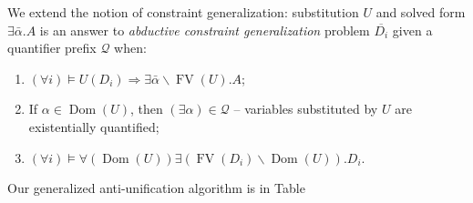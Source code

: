 \documentclass{article}
\newcommand{\tmem}[1]{{\em #1\/}}
\newcommand{\tmop}[1]{\ensuremath{\operatorname{#1}}}
\begin{document}
We extend the notion of constraint generalization: substitution $U$ and solved
form $\exists \bar{\alpha} .A$ is an answer to {\tmem{abductive constraint
generalization}} problem $\overline{D_i}$ given a quantifier prefix
$\mathcal{Q}$ when:
\begin{enumerate}
  \item $(\forall i) \vDash U (D_i) \Rightarrow \exists \bar{\alpha}
  \backslash \tmop{FV} (U) .A$;
  
  \item If $\alpha \in \tmop{Dom} (U)$, then $(\exists \alpha) \in
  \mathcal{Q}$ -- variables substituted by $U$ are existentially quantified;
  
  \item $(\forall i) \vDash \forall (\tmop{Dom} (U)) \exists (\tmop{FV} (D_i)
  \backslash \tmop{Dom} (U)) .D_i$.
\end{enumerate}
Our generalized anti-unification algorithm is in Table
\end{document}
